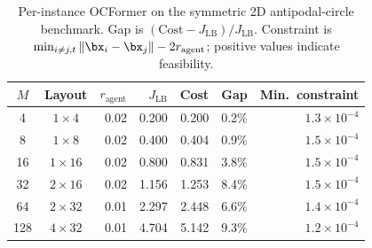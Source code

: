 \begin{table}[htbp]
  \centering
  \caption{Per-instance OCFormer on the symmetric 2D antipodal-circle benchmark. Gap is $(\text{Cost}-J_{\text{LB}})/J_{\text{LB}}$. Constraint is $\min_{i\neq j,t}\|\bx_i-\bx_j\|-2r_{\mathrm{agent}}$; positive values indicate feasibility.}
  \label{tab:oc:2d-scaling}
  \begin{tabular}{@{}ccrrrrr@{}}
    \toprule
    $M$ & Layout & $r_{\mathrm{agent}}$ & $J_{\text{LB}}$ & Cost & Gap & Min.\ constraint \\
    \midrule
    4   & $1\times 4$  & 0.02 & 0.200 & 0.200 & 0.2\% & $1.3\times 10^{-4}$ \\
    8   & $1\times 8$  & 0.02 & 0.400 & 0.404 & 0.9\% & $1.5\times 10^{-4}$ \\
    16  & $1\times 16$ & 0.02 & 0.800 & 0.831 & 3.8\% & $1.5\times 10^{-4}$ \\
    32  & $2\times 16$ & 0.02 & 1.156 & 1.253 & 8.4\% & $1.5\times 10^{-4}$ \\
    64  & $2\times 32$ & 0.01 & 2.297 & 2.448 & 6.6\% & $1.4\times 10^{-4}$ \\
    128 & $4\times 32$ & 0.01 & 4.704 & 5.142 & 9.3\% & $1.2\times 10^{-4}$ \\
    \bottomrule
  \end{tabular}
\end{table}
